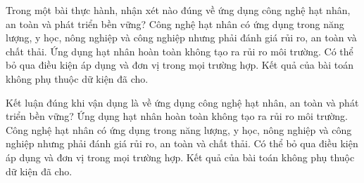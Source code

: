 \begin{ex}
Trong một bài thực hành, nhận xét nào đúng về ứng dụng công nghệ hạt nhân, an toàn và phát triển bền vững?
\choice
{\True Công nghệ hạt nhân có ứng dụng trong năng lượng, y học, nông nghiệp và công nghiệp nhưng phải đánh giá rủi ro, an toàn và chất thải.}
{Ứng dụng hạt nhân hoàn toàn không tạo ra rủi ro môi trường.}
{Có thể bỏ qua điều kiện áp dụng và đơn vị trong mọi trường hợp.}
{Kết quả của bài toán không phụ thuộc dữ kiện đã cho.}
\end{ex}

\begin{ex}
Kết luận đúng khi vận dụng là về ứng dụng công nghệ hạt nhân, an toàn và phát triển bền vững?
\choice
{Ứng dụng hạt nhân hoàn toàn không tạo ra rủi ro môi trường.}
{\True Công nghệ hạt nhân có ứng dụng trong năng lượng, y học, nông nghiệp và công nghiệp nhưng phải đánh giá rủi ro, an toàn và chất thải.}
{Có thể bỏ qua điều kiện áp dụng và đơn vị trong mọi trường hợp.}
{Kết quả của bài toán không phụ thuộc dữ kiện đã cho.}
\end{ex}
